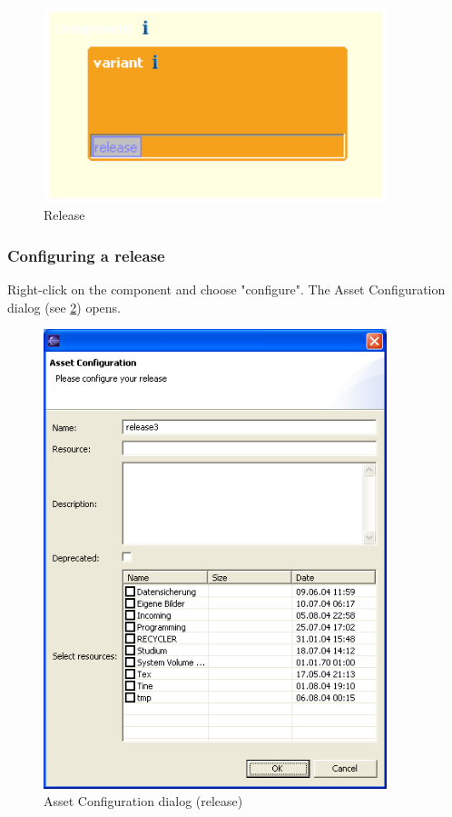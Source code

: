 \begin{figure}[h!]
\begin{center}
\includegraphics[width=10cm]{release.png}
   \caption{Release}
\label{release}
\end{center}
\end{figure}\par


\subsubsection{Configuring a release}
Right-click on the component and choose "configure". The Asset Configuration dialog (see \ref{config2}) opens.


\begin{figure}[h!]
\begin{center}
\includegraphics[width=10cm]{config2.png}
   \caption{Asset Configuration dialog (release)}
\label{config2}
\end{center}
\end{figure}\par


